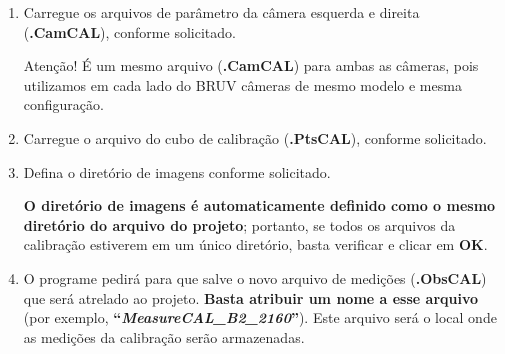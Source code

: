 \documentclass[
  12pt,
  letterpaper,
  DIV=11,
  numbers=noendperiod]{scrreprt}
\begin{document}
\begin{enumerate}
\def\labelenumi{\arabic{enumi}.}
\setcounter{enumi}{9}
\item
  Carregue os arquivos de parâmetro da câmera esquerda e direita
  (\textbf{.CamCAL}), conforme solicitado.

  \begin{tcolorbox}[enhanced jigsaw, opacityback=0, toprule=.15mm, colframe=quarto-callout-caution-color-frame, arc=.35mm, breakable, rightrule=.15mm, left=2mm, leftrule=.75mm, colback=white, bottomrule=.15mm]
  \begin{minipage}[t]{5.5mm}
  \textcolor{quarto-callout-caution-color}{\faFire}
  \end{minipage}%
  \begin{minipage}[t]{\textwidth - 5.5mm}

  Atenção! É um mesmo arquivo (\textbf{.CamCAL}) para ambas as câmeras,
  pois utilizamos em cada lado do BRUV câmeras de mesmo modelo e mesma
  configuração.

  \end{minipage}%
  \end{tcolorbox}
\item
  Carregue o arquivo do cubo de calibração (\textbf{.PtsCAL}), conforme
  solicitado.
\item
  Defina o diretório de imagens conforme solicitado.

  \begin{tcolorbox}[enhanced jigsaw, opacityback=0, toprule=.15mm, colframe=quarto-callout-note-color-frame, arc=.35mm, breakable, rightrule=.15mm, left=2mm, leftrule=.75mm, colback=white, bottomrule=.15mm]
  \begin{minipage}[t]{5.5mm}
  \textcolor{quarto-callout-note-color}{\faInfo}
  \end{minipage}%
  \begin{minipage}[t]{\textwidth - 5.5mm}

  \textbf{O diretório de imagens é automaticamente definido como o mesmo
  diretório do arquivo do projeto}; portanto, se todos os arquivos da
  calibração estiverem em um único diretório, basta verificar e clicar
  em \textbf{OK}.

  \end{minipage}%
  \end{tcolorbox}
\item
  O programe pedirá para que salve o novo arquivo de medições
  (\textbf{.ObsCAL}) que será atrelado ao projeto. \textbf{Basta
  atribuir um nome a esse arquivo} (por exemplo,
  \textbf{``\textbf{\emph{MeasureCAL\_B2\_2160}}''}). Este arquivo será
  o local onde as medições da calibração serão armazenadas.


\end{enumerate}
\end{document}
